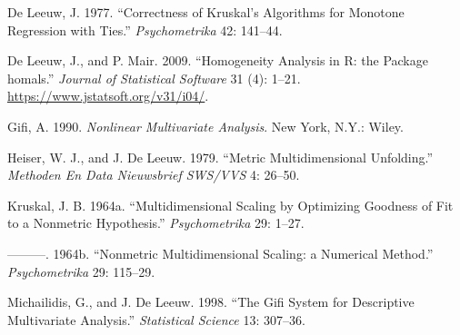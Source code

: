 \documentclass[
  12pt,
]{article}
\newlength{\cslhangindent}
\newenvironment{CSLReferences}[2] %
 {\begin{list}{}{%
  \setlength{\itemindent}{0pt}
  \setlength{\leftmargin}{0pt}
  \setlength{\parsep}{0pt}
  \ifodd #1
   \setlength{\leftmargin}{\cslhangindent}
   \setlength{\itemindent}{-1\cslhangindent}
  \fi
  \setlength{\itemsep}{#2\baselineskip}}}
 {\end{list}}
\begin{document}
\label{refs}
\begin{CSLReferences}{1}{0}
De Leeuw, J. 1977. {``Correctness of Kruskal's Algorithms for Monotone Regression with Ties.''} \emph{Psychometrika} 42: 141--44.

De Leeuw, J., and P. Mair. 2009. {``{Homogeneity Analysis in {R}: the Package homals}.''} \emph{Journal of Statistical Software} 31 (4): 1--21. \url{https://www.jstatsoft.org/v31/i04/}.

Gifi, A. 1990. \emph{Nonlinear Multivariate Analysis}. New York, N.Y.: Wiley.

Heiser, W. J., and J. De Leeuw. 1979. {``Metric Multidimensional Unfolding.''} \emph{Methoden En Data Nieuwsbrief SWS/VVS} 4: 26--50.

Kruskal, J. B. 1964a. {``{Multidimensional Scaling by Optimizing Goodness of Fit to a Nonmetric Hypothesis}.''} \emph{Psychometrika} 29: 1--27.

---------. 1964b. {``{Nonmetric Multidimensional Scaling: a Numerical Method}.''} \emph{Psychometrika} 29: 115--29.

Michailidis, G., and J. De Leeuw. 1998. {``The Gifi System for Descriptive Multivariate Analysis.''} \emph{Statistical Science} 13: 307--36.

\end{CSLReferences}
\end{document}
